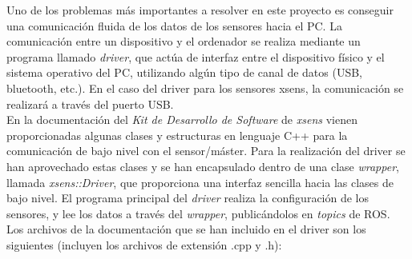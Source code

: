 \documentclass[12pt, a4paper]{report}
\begin{document}
Uno de los problemas más importantes a resolver en este proyecto es conseguir una comunicación fluida de los datos de los sensores hacia el PC. La comunicación entre un dispositivo y el ordenador se realiza mediante un programa llamado \textit{driver}, que actúa de interfaz entre el dispositivo físico y el sistema operativo del PC, utilizando algún tipo de canal de datos (USB, bluetooth, etc.). En el caso del driver para los sensores xsens, la comunicación se realizará a través del puerto USB.\\

En la documentación del \textit{Kit de Desarrollo de Software} de \textit{xsens} vienen proporcionadas algunas clases y estructuras en lenguaje C++ para la comunicación de bajo nivel con el sensor/máster. Para la realización del driver se han aprovechado estas clases y se han encapsulado dentro de una clase \textit{wrapper}, llamada \textit{xsens::Driver}, que proporciona una interfaz sencilla hacia las clases de bajo nivel. El programa principal del \textit{driver} realiza la configuración de los sensores, y lee los datos a través del \textit{wrapper}, publicándolos en \textit{topics} de ROS.\\

Los archivos de la documentación que se han incluido en el driver son los siguientes (incluyen los archivos de extensión .cpp y .h):
\end{document}
